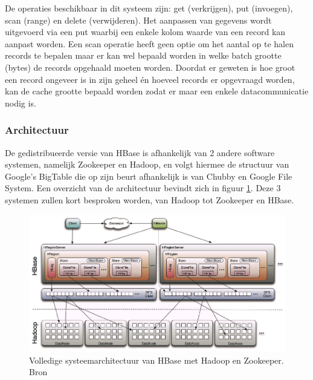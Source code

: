 De operaties beschikbaar in dit systeem zijn: get (verkrijgen), put (invoegen), scan (range) en delete (verwijderen). Het aanpassen van gegevens wordt uitgevoerd via een put waarbij een enkele kolom waarde van een record kan aanpast worden. Een scan operatie heeft geen optie om het aantal op te halen records te bepalen maar er kan wel bepaald worden in welke batch grootte (bytes) de records opgehaald moeten worden. Doordat er geweten is hoe groot een record ongeveer is in zijn geheel én hoeveel records er opgevraagd worden, kan de cache grootte bepaald worden zodat er maar een enkele datacommunicatie nodig is. 

\subsubsection{Architectuur}
De gedistribueerde versie van HBase\cite{george2011hbase} is afhankelijk van 2 andere software systemen, namelijk Zookeeper\cite{hunt2010zookeeper} en Hadoop\cite{borthakur2007hadoop}, en volgt hiermee de structuur van Google's BigTable\cite{chang2008bigtable} die op zijn beurt afhankelijk is van Chubby\cite{burrows2006chubby} en Google File System\cite{ghemawat2003google}. Een overzicht van de architectuur bevindt zich in figuur \ref{fig:Hbase-structure}. Deze 3 systemen zullen kort besproken worden, van Hadoop tot Zookeeper en HBase. 

\begin{figure}[h!]
\centering
\includegraphics[width=\linewidth]{img/Hbase-structure.png}
\caption{Volledige systeemarchitectuur van HBase met Hadoop en Zookeeper. Bron \cite{ChinHBaseComprehensive}}
\label{fig:Hbase-structure}
\end{figure}

